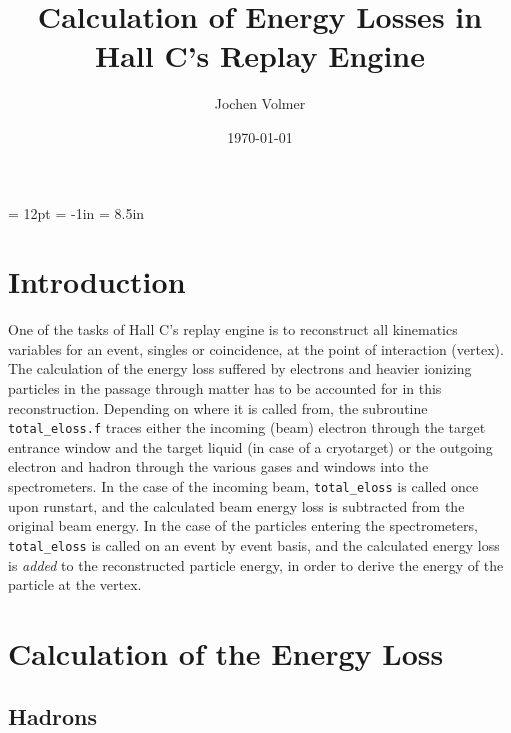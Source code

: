 \parindent = 12pt
\voffset = -1in
\textheight = 8.5in



\title{Calculation of Energy Losses in Hall C's Replay Engine }
\author{Jochen Volmer}
\date{\today}
\maketitle

\section{Introduction}
\hspace*{\parindent}

One of the tasks of Hall C's replay engine is to reconstruct all kinematics
variables for an event, singles or coincidence, at the point of interaction
(vertex). The calculation of the energy loss suffered by electrons and heavier 
ionizing particles in the passage through matter has to be accounted for in 
this reconstruction. Depending on where it is called from, the subroutine 
{\tt total\_eloss.f} traces either the incoming (beam) electron through the 
target entrance window and the target liquid (in case of a cryotarget) or 
the outgoing electron and hadron through the various gases and windows into 
the spectrometers. In the case of the incoming beam, {\tt total\_eloss} is
called once upon runstart, and the calculated beam energy loss is subtracted 
from the original beam energy. In the case of the particles entering the
spectrometers, {\tt total\_eloss} is called on an event by event basis, and
the calculated energy loss is {\em added} to the reconstructed particle
energy, in order to derive the energy of the particle at the vertex.

\section{Calculation of the Energy Loss}

\subsection{Hadrons}
\hspace*{\parindent}

